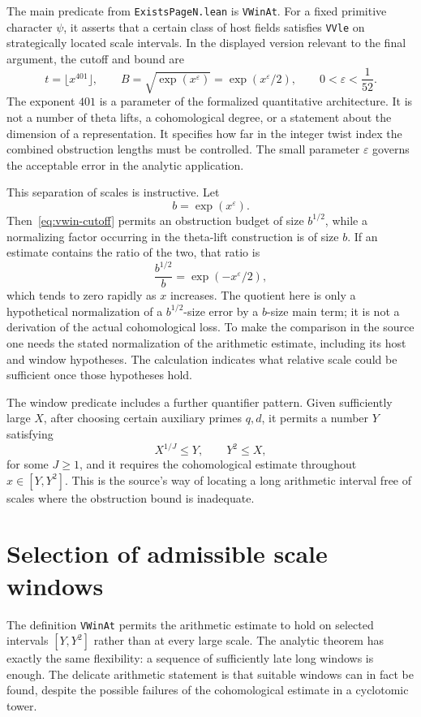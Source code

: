 \documentclass[11pt,openany,oneside]{scrbook}
\theoremstyle{definition}
\theoremstyle{remark}
\newcommand{\eps}{\varepsilon}
\begin{document}
The main predicate from \texttt{ExistsPageN.lean} is \texttt{VWinAt}. For a fixed primitive character $\psi$, it asserts that a certain class of host fields satisfies \texttt{VVle} on strategically located scale intervals. In the displayed version relevant to the final argument, the cutoff and bound are
\begin{equation}\label{eq:vwin-cutoff}
t=\lfloor x^{401}\rfloor,
\qquad B=\sqrt{\exp(x^\eps)}=\exp(x^\eps/2),
\qquad 0<\eps<\frac1{52}.
\end{equation}
The exponent $401$ is a parameter of the formalized quantitative architecture. It is not a number of theta lifts, a cohomological degree, or a statement about the dimension of a representation. It specifies how far in the integer twist index the combined obstruction lengths must be controlled. The small parameter $\eps$ governs the acceptable error in the analytic application.

This separation of scales is instructive. Let
\[
b=\exp(x^\eps).
\]
Then~\eqref{eq:vwin-cutoff} permits an obstruction budget of size $b^{1/2}$, while a normalizing factor occurring in the theta-lift construction is of size $b$. If an estimate contains the ratio of the two, that ratio is
\[
\frac{b^{1/2}}b=\exp(-x^\eps/2),
\]
which tends to zero rapidly as $x$ increases. The quotient here is only a hypothetical normalization of a $b^{1/2}$-size error by a $b$-size main term; it is not a derivation of the actual cohomological loss. To make the comparison in the source one needs the stated normalization of the arithmetic estimate, including its host and window hypotheses. The calculation indicates what relative scale could be sufficient once those hypotheses hold.

The window predicate includes a further quantifier pattern. Given sufficiently large $X$, after choosing certain auxiliary primes $q,d$, it permits a number $Y$ satisfying
\begin{equation}\label{eq:chooseY}
X^{1/J}\le Y,
\qquad Y^2\le X,
\end{equation}
for some $J\ge1$, and it requires the cohomological estimate throughout $x\in[Y,Y^2]$. This is the source's way of locating a long arithmetic interval free of scales where the obstruction bound is inadequate.

\section{Selection of admissible scale windows}
The definition \texttt{VWinAt} permits the arithmetic estimate to hold on selected intervals $[Y,Y^2]$ rather than at every large scale. The analytic theorem has exactly the same flexibility: a sequence of sufficiently late long windows is enough. The delicate arithmetic statement is that suitable windows can in fact be found, despite the possible failures of the cohomological estimate in a cyclotomic tower.
\end{document}
